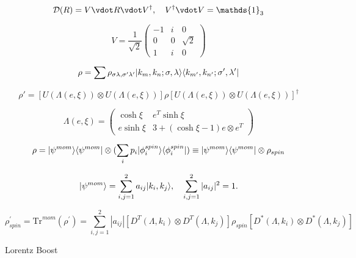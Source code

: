 \begin{equation}
    \mathcal{D}(R) = V \vdot R \vdot V^\dagger, \quad V^\dagger\vdot V = \mathds{1}_3
\end{equation}

\begin{equation}
    V = \frac{1}{\sqrt{2}}\begin{pmatrix}
        -1 & i & 0 \\
        0 & 0 & \sqrt{2} \\
        1 & i & 0 
        \end{pmatrix}
\end{equation}

\begin{equation}
    \rho = \sum \rho_{\sigma \lambda, \sigma' \lambda'} \lvert k_m, k_n ; \sigma, \lambda\rangle \langle k_{m'}, k_{n'} ; \sigma', \lambda'\rvert
\end{equation}

\begin{equation}
    \rho' = \left[ U(\Lambda(e, \xi)) \otimes U(\Lambda(e, \xi)) \right] \rho \left[ U(\Lambda(e, \xi)) \otimes U(\Lambda(e, \xi)) \right]^\dagger
\end{equation}

\begin{equation}
    \Lambda(e, \xi) =
    \begin{pmatrix}
        \cosh \xi & e^T \sinh \xi \\
        e \sinh \xi & 3 + (\cosh \xi - 1) e \otimes e^T
    \end{pmatrix}
\end{equation}

\begin{equation}
    \rho = \lvert\psi^{mom}\rangle\langle\psi^{mom}\rvert \otimes (\sum_{i} p_i\lvert\phi_i^{spin}\rangle\langle\phi_i^{spin}\rvert) \equiv \lvert\psi^{mom}\rangle\langle\psi^{mom}\rvert \otimes \rho_{spin}
\end{equation}

\begin{equation}
    \lvert\psi^{mom}\rangle = \sum_{i,j=1}^{2}a_{ij}\lvert k_i,k_j\rangle, \quad \sum_{i,j=1}^{2}|a_{ij}|^2 = 1.
\end{equation}

\begin{equation}
    \rho^\prime_{spin} = \text{Tr}^{mom}(\rho^\prime) = \sum_{i,j=1}^{2}|a_{ij}|[D^T(\Lambda,k_i) \otimes D^T(\Lambda,k_j)]\rho_{spin}[D^*(\Lambda,k_i) \otimes D^*(\Lambda,k_j)]
\end{equation}

Lorentz Boost

